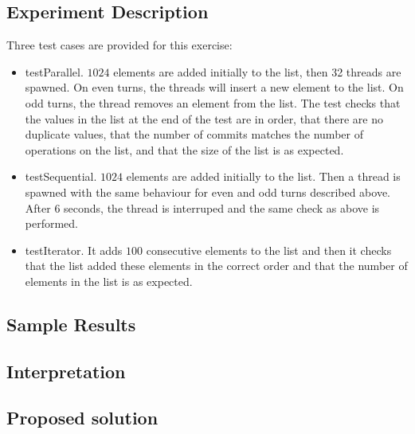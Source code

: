 \subsection{Experiment Description}
\par
Three test cases are provided for this exercise:
\begin{itemize}
\item testParallel. $1024$ elements are added initially to the list, then 32
threads are spawned. On even turns, the threads will insert a new element to the
list. On odd turns, the thread removes an element from the list. The test checks
that the values in the list at the end of the test are in order, that there are
no duplicate values, that the number of commits matches the number of operations
on the list, and that the size of the list is as expected.
\item testSequential. $1024$ elements are added initially to the list. Then a
thread is spawned with the same behaviour for even and odd turns described
above. After $6$ seconds, the thread is interruped and the same check as above
is performed.
\item testIterator. It adds $100$ consecutive elements to the list and then it
checks that the list added these elements in the correct order and that the
number of elements in the list is as expected.
\end{itemize}
\par
\subsection{Sample Results}
\par
\par
\subsection{Interpretation}
\par
\par
\subsection{Proposed solution}
\par
\par
